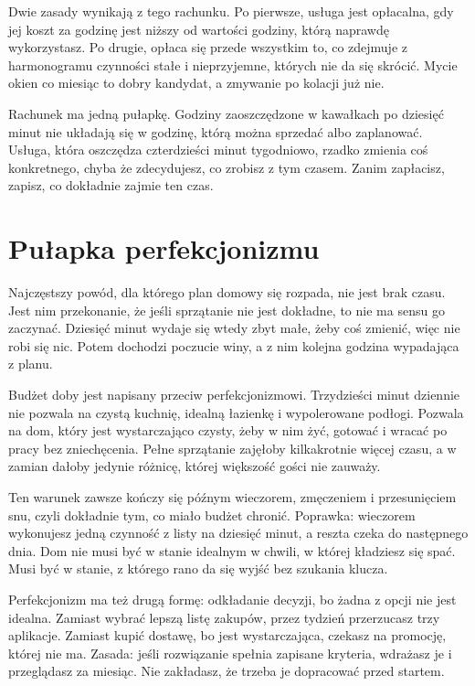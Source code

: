 Dwie zasady wynikają z tego rachunku. Po pierwsze, usługa jest opłacalna,
gdy jej koszt za godzinę jest niższy od wartości godziny, którą naprawdę
wykorzystasz. Po drugie, opłaca się przede wszystkim to, co zdejmuje z
harmonogramu czynności stałe i nieprzyjemne, których nie da się skrócić.
Mycie okien co miesiąc to dobry kandydat, a zmywanie po kolacji już nie.

Rachunek ma jedną pułapkę. Godziny zaoszczędzone w kawałkach po dziesięć
minut nie układają się w godzinę, którą można sprzedać albo zaplanować.
Usługa, która oszczędza czterdzieści minut tygodniowo, rzadko zmienia coś
konkretnego, chyba że zdecydujesz, co zrobisz z tym czasem. Zanim
zapłacisz, zapisz, co dokładnie zajmie ten czas.

\section{Pułapka perfekcjonizmu}

Najczęstszy powód, dla którego plan domowy się rozpada, nie jest brak czasu.
Jest nim przekonanie, że jeśli sprzątanie nie jest dokładne, to nie ma
sensu go zaczynać. Dziesięć minut wydaje się wtedy zbyt małe, żeby coś
zmienić, więc nie robi się nic. Potem dochodzi poczucie winy, a z nim
kolejna godzina wypadająca z planu.

Budżet doby jest napisany przeciw perfekcjonizmowi. Trzydzieści minut
dziennie nie pozwala na czystą kuchnię, idealną łazienkę i wypolerowane
podłogi. Pozwala na dom, który jest wystarczająco czysty, żeby w nim żyć,
gotować i wracać po pracy bez zniechęcenia. Pełne sprzątanie zajęłoby
kilkakrotnie więcej czasu, a w zamian dałoby jedynie różnicę, której
większość gości nie zauważy.

\begin{falle}
Ten warunek zawsze kończy się późnym wieczorem, zmęczeniem i przesunięciem
snu, czyli dokładnie tym, co miało budżet chronić. Poprawka: wieczorem
wykonujesz jedną czynność z listy na dziesięć minut, a reszta czeka do
następnego dnia. Dom nie musi być w stanie idealnym w chwili, w której
kładziesz się spać. Musi być w stanie, z którego rano da się wyjść bez
szukania klucza.
\end{falle}

Perfekcjonizm ma też drugą formę: odkładanie decyzji, bo żadna z opcji nie
jest idealna. Zamiast wybrać lepszą listę zakupów, przez tydzień
przerzucasz trzy aplikacje. Zamiast kupić dostawę, bo jest wystarczająca,
czekasz na promocję, której nie ma. Zasada: jeśli rozwiązanie spełnia
zapisane kryteria, wdrażasz je i przeglądasz za miesiąc. Nie zakładasz, że
trzeba je dopracować przed startem.

